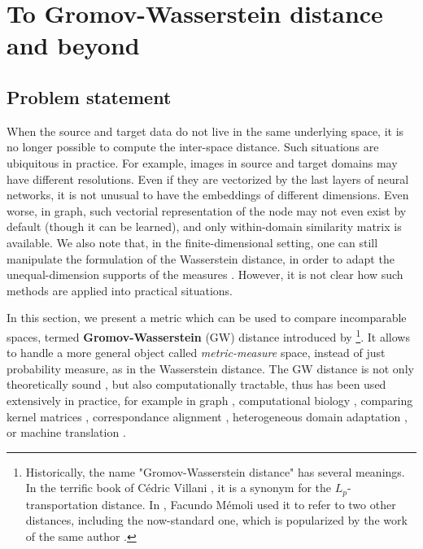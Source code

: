 \section{To Gromov-Wasserstein distance and beyond} \label{sec:gw}

\subsection{Problem statement}

When the source and target data do not live in the same underlying space, it is no longer possible
to compute the inter-space distance. Such situations are ubiquitous in practice.
For example, images in source and target domains may have different resolutions. Even if they
are vectorized by the last layers of neural networks, it is not unusual to have the
embeddings of different dimensions. Even worse, in graph,
such vectorial representation of the node may not even exist by default
(though it can be learned), and only within-domain similarity matrix is available.
We also note that, in the finite-dimensional setting,
one can still manipulate the formulation of the Wasserstein distance,
in order to adapt the unequal-dimension supports of the measures \citep{Cai22,McCann20}.
However, it is not clear how such methods are applied into practical situations.

In this section, we present a metric which can be used to compare incomparable spaces,
termed \textbf{Gromov-Wasserstein} (GW) distance introduced by \citep{Memoli07,Memoli11}
\footnote{Historically, the name "Gromov-Wasserstein distance" has several meanings.
In the terrific book of Cédric Villani \citep{Villani08}, it is a synonym
for the $L_p$-transportation distance. In \citep{Memoli11b},
Facundo Mémoli used it to refer to two other distances, including the now-standard one, which is
popularized by the work of the same author \citep{Memoli11}.}. It allows to handle a more general
object called \textit{metric-measure} space, instead of just probability measure, as in
the Wasserstein distance. The GW distance is not only theoretically sound \citep{Memoli11,Sturm12},
but also computationally tractable, thus has been used extensively in practice,
for example in graph \citep{Vayer19b,Xu19,Xu19b,Chowdhury20,Vincent21},
computational biology \citep{Demetci20}, comparing kernel matrices \citep{Peyre16},
correspondance alignment \citep{Solomon16}, heterogeneous domain adaptation \citep{Yan18},
or machine translation \citep{Melis18}.

